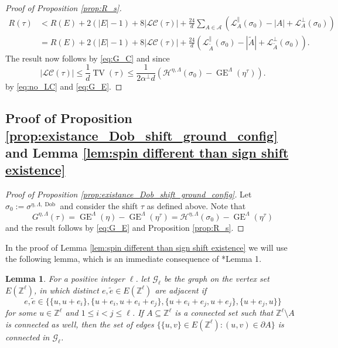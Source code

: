 \documentclass[11pt, reqno]{amsart}
\newtheorem{lemma}[theorem]{Lemma}
\DeclareMathOperator{\Dob}{Dob}
\DeclareMathOperator{\GE}{GE}
\DeclareMathOperator{\TV}{TV}
\numberwithin{equation}{section}
\begin{document}
\begin{proof}[Proof of Proposition \ref{prop:R_s}]
\begin{align*}
R({\tau})&< R(E)+2(\lvert E\rvert-1)
+8\lvert\mathcal{LC}({\tau})\rvert+\frac{24}{d}\sum_{A\in{\mathcal A}}\left(\mathcal{L}^{\parallel}_A(\sigma_0)-|A|+\mathcal{L}^{\perp}_A(\sigma_0)\right)\\
&= R(E)+2(\lvert E\rvert-1)
+8\lvert\mathcal{LC}({\tau})\rvert+\frac{24}{d}\left(\mathcal{L}^{\parallel}_{\tilde{A}}(\sigma_0)-|\tilde{A}|+\mathcal{L}^{\perp}_{\tilde{A}}(\sigma_0)\right).
\end{align*}
The result now follows by \eqref{eq:G_C} and since
\begin{equation*}
\lvert\mathcal{LC}({\tau})\rvert\leq\frac{1}{d}\TV({\tau})\leq \frac{1}{2\alpha^{\perp}d}\left(\mathcal{H}^{\eta,\Lambda}(\sigma_0) -\GE^{\Lambda}(\eta^{\tau})\right).
\end{equation*}
by \eqref{eq:no_LC} 
and \eqref{eq:G_E}.
\end{proof}

\subsection{Proof of Proposition \ref{prop:existance_Dob_shift_ground_config} and Lemma \ref{lem:spin different than sign shift existence}}
\label{sec:4_4}

\begin{proof}[Proof of Proposition \ref{prop:existance_Dob_shift_ground_config}]
Let $\sigma_0:=\sigma^{\eta,\Lambda,\Dob}$ and consider
the shift ${\tau}$ as defined above. 
Note that 
\begin{equation}\label{eq:G_H-GE}
G^{\eta,\Lambda}({\tau})=\GE^{\Lambda}(\eta)-\GE^{\Lambda}(\eta^{\tau})=\mathcal{H}^{\eta,\Lambda}\left(\sigma_0\right) -\GE^{\Lambda}(\eta^{\tau})
\end{equation}
and the result follows by \eqref{eq:G_E} and Proposition \ref{prop:R_s}.
\end{proof}

In the proof of Lemma \ref{lem:spin different than sign shift existence} we will use the following lemma, which is an immediate consequence of \cite{T}*{Lemma 1}.

\begin{lemma}\label{lem:Timar1}
For a positive integer $\ell$. let ${\mathcal G}_{\ell}$ be the graph on the vertex set $E({\mathbb Z}^{\ell})$, in which distinct $e,\tilde{e}\in E({\mathbb Z}^{\ell})$ are adjacent if 
$$e,\tilde{e}\in \{\{u,u+e_i\},\{u+e_i,u+e_i+e_j\},\{u+e_i+e_j,u+e_j\},\{u+e_j,u\}\}$$ for some $u\in{\mathbb Z}^{\ell}$ and $1\leq i<j\leq\ell$.
If $A\subseteq{\mathbb Z}^{\ell}$ is a connected set such that ${\mathbb Z}^{\ell}\setminus A$ is connected as well, then the set of edges $\{\{u,v\}\in E({\mathbb Z}^{\ell})\colon (u,v)\in\partial A\}$ is connected in ${\mathcal G}_{\ell}$.
\end{lemma}
\end{document}

